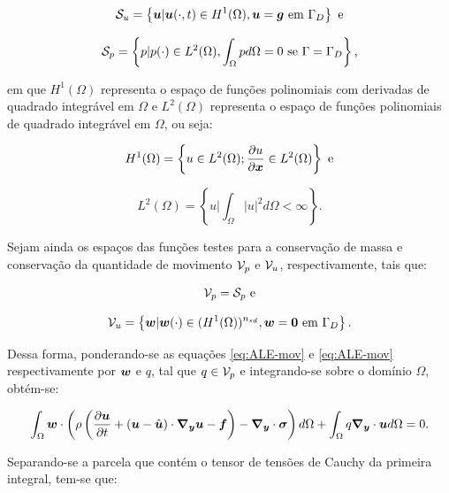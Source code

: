 \begin{equation}
    \mathcal{S}_u=\left\{\boldsymbol{u}|\boldsymbol{u}(\cdot,t)\in H^1(\Omega),\boldsymbol{u}=\boldsymbol{g}\text{ em }\Gamma_D\right\}\text{ e}
\end{equation}

\begin{equation}
    \mathcal{S}_p=\left\{p|p(\cdot)\in L^2(\Omega),\int_\Omega{pd\Omega}=0\text{ se }\Gamma=\Gamma_D\right\}\text{,}
\end{equation}

\noindent em que $H^1(\Omega)$ representa o espaço de funções polinomiais com derivadas de quadrado integrável em $\Omega$ e $L^2(\Omega)$ representa o espaço de funções polinomiais de quadrado integrável em $\Omega$, ou seja:

\begin{equation}
    H^1(\Omega)=\left\{u\in L^2(\Omega);\frac{\partial{u}}{\partial{\boldsymbol{x}}}\in L^2(\Omega)\right\}\text{ e}
\end{equation}

\begin{equation}
    L^2(\Omega)=\left\{u\big|\int_\Omega{|u|^2d\Omega}<\infty\right\}\text{.}
\end{equation}

Sejam ainda os espaços das funções testes para a conservação de massa e conservação da quantidade de movimento $\mathcal{V}_p$ e $\mathcal{V}_u$, respectivamente, tais que:

\begin{equation}
    \mathcal{V}_p=\mathcal{S}_p\text{ e}
\end{equation}

\begin{equation}
    \mathcal{V}_u=\left\{\boldsymbol{w}|\boldsymbol{w}(\cdot)\in(H^1(\Omega))^{n_{sd}},\boldsymbol{w}=\boldsymbol{0}\text{ em }\Gamma_D\right\}\text{.}
\end{equation}

Dessa forma, ponderando-se as equações \eqref{eq:ALE-mov} e \eqref{eq:ALE-mov} respectivamente por $\boldsymbol{w}$ e $q$, tal que $q\in\mathcal{V}_p$ e integrando-se sobre o domínio $\Omega$, obtém-se:

\begin{equation}
    \int_{\Omega}{\boldsymbol{w}\cdot\left({\rho\left({\frac{\partial{\boldsymbol{u}}}{\partial t}+(\boldsymbol{u}-\hat{\boldsymbol{u}})\cdot\boldsymbol{\nabla_y}\boldsymbol{u}-\boldsymbol{f}}\right)-\boldsymbol{\nabla_y}\cdot\boldsymbol{\sigma}}\right) d\Omega}+\int_{\Omega}{q\boldsymbol{\nabla_y}\cdot\boldsymbol{u} d\Omega}=0\text{.}
\end{equation}

Separando-se a parcela que contém o tensor de tensões de Cauchy da primeira integral, tem-se que:

